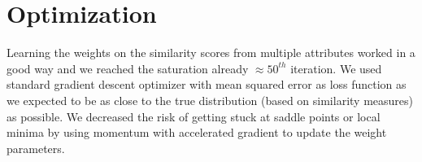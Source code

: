 \section{Optimization}
Learning the weights on the similarity scores from multiple attributes worked in a good way and we reached the saturation already $\approx 50^{th}$ iteration. We used standard gradient descent optimizer with mean squared error as loss function as we expected to be as close to the true distribution (based on similarity measures) as possible. We decreased the risk of getting stuck at saddle points or local minima by using momentum with accelerated gradient to update the weight parameters.
